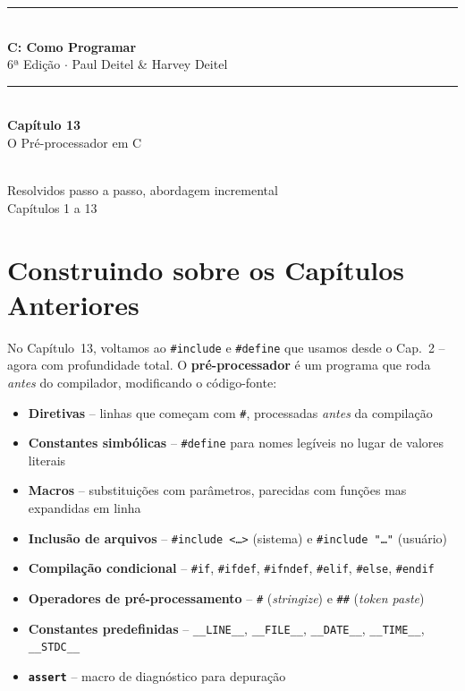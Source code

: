 \documentclass[12pt,a4paper]{article}
\begin{document}
\begin{titlepage}
  \centering\vspace*{2cm}
  {\color{deitelblue}\rule{\linewidth}{2pt}}\\[0.4cm]
  {\huge\bfseries\color{deitelblue}C: Como Programar}\\[0.2cm]
  {\large\color{deitelblue}6ª Edição $\cdot$ Paul Deitel \& Harvey Deitel}\\[0.2cm]
  {\color{deitelblue}\rule{\linewidth}{2pt}}\\[1cm]
  {\LARGE\bfseries Capítulo 13}\\[0.3cm]
  {\Large\color{deitelblue!80}O Pré-processador em C}\\[0.8cm]
  \begin{tcolorbox}[colback=deitellightblue,colframe=deitelblue,width=0.85\linewidth]
    \\[0.2cm]
    {\normalsize Resolvidos passo a passo, abordagem incremental\\
    Capítulos 1 a 13}
  \end{tcolorbox}
\end{titlepage}

\section*{Construindo sobre os Capítulos Anteriores}

No Capítulo~13, voltamos ao \texttt{\#include} e \texttt{\#define} que usamos
desde o Cap.~2 -- agora com profundidade total. O \textbf{pré-processador} é um
programa que roda \textit{antes} do compilador, modificando o código-fonte:

\begin{itemize}[noitemsep]
  \item \textbf{Diretivas} -- linhas que começam com \texttt{\#}, processadas
  \textit{antes} da compilação
  \item \textbf{Constantes simbólicas} -- \texttt{\#define} para nomes legíveis
  no lugar de valores literais
  \item \textbf{Macros} -- substituições com parâmetros, parecidas com funções
  mas expandidas em linha
  \item \textbf{Inclusão de arquivos} -- \texttt{\#include <\ldots>} (sistema) e
  \texttt{\#include "\ldots"} (usuário)
  \item \textbf{Compilação condicional} -- \texttt{\#if}, \texttt{\#ifdef},
  \texttt{\#ifndef}, \texttt{\#elif}, \texttt{\#else}, \texttt{\#endif}
  \item \textbf{Operadores de pré-processamento} -- \texttt{\#} (\textit{stringize})
  e \texttt{\#\#} (\textit{token paste})
  \item \textbf{Constantes predefinidas} -- \texttt{\_\_LINE\_\_}, \texttt{\_\_FILE\_\_},
  \texttt{\_\_DATE\_\_}, \texttt{\_\_TIME\_\_}, \texttt{\_\_STDC\_\_}
  \item \textbf{\texttt{assert}} -- macro de diagnóstico para depuração
\end{itemize}
\end{document}
